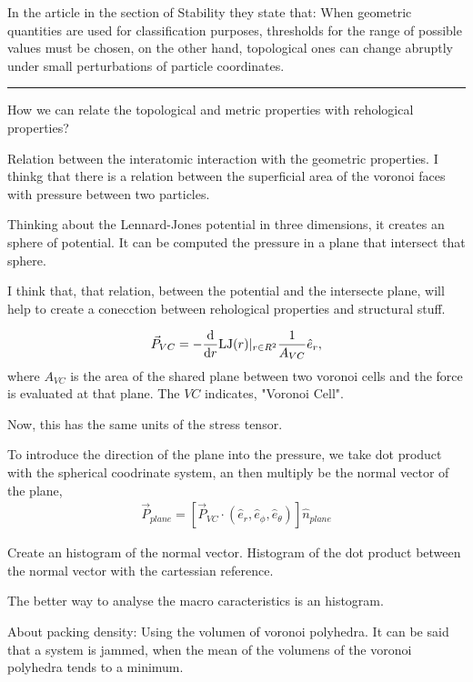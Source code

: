 \documentclass[a4paper, 11pt, oneside]{researchjournal} %
\begin{document}
In the article \cite{lazarVoronoiCellAnalysis2022} 
in the section of Stability they state that:
When geometric quantities are used for classification purposes, thresholds for the range of possible values must be chosen, on the other hand, topological ones can change abruptly under small perturbations of particle coordinates.


\rule{\textwidth}{0.4pt}

How we can relate the topological and metric properties with rehological properties?

Relation between the interatomic interaction with the geometric properties.
I thinkg that there is a relation between the superficial area of the voronoi faces with pressure between two particles.

Thinking about the Lennard-Jones potential in three dimensions, it creates an sphere of potential.
It can be computed the pressure in a plane that intersect that sphere.

I think that, that relation, between the potential and the intersecte plane, will help to create a conecction between rehological properties and structural stuff.

\begin{align*}
	\vec{P}_{VC} = -\dv{r}\mathrm{LJ}(r)|_{r\in R^{2}}\frac{1}{A_{VC}}\hat{e}_{r},
\end{align*}
where $A_{VC}$ is the area of the shared plane between two voronoi cells and the force is evaluated at that plane.
The $VC$ indicates, "Voronoi Cell".

Now, this has the same units of the stress tensor.

To introduce the direction of the plane into the pressure, we take dot product with the spherical coodrinate system, an then multiply be the normal vector of the plane,
\begin{align*}
	\vec{P}_{plane} = \left[\vec{P}_{VC}\cdot\left(\hat{e}_r,\hat{e}_\phi,\hat{e}_\theta\right)\right]\hat{n}_{plane}
\end{align*}


Create an histogram of the normal vector.
Histogram of the dot product between the normal vector with the cartessian reference.

The better way to analyse the macro caracteristics is an histogram.


About packing density: Using the volumen of voronoi polyhedra.
It can be said that a system is jammed, when the mean of the volumens of the voronoi polyhedra tends to a minimum.
\end{document}
